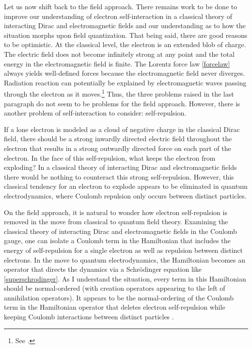 \documentclass[12pt,onecolumn,secnumarabic,amsmath,amssymb,balancelastpage,nofootinbib]{article}
\begin{document}
Let us now shift back to the field approach.  There remains work to be done to improve our understanding of electron self-interaction in a classical theory of interacting Dirac and electromagnetic fields and our understanding as to how the situation morphs upon field quantization.  That being said, there are good reasons to be optimistic.  At the classical level, the electron is an extended blob of charge.  The electric field does not become infinitely strong at any point and the total energy in the electromagnetic field is finite.  The Lorentz force law \eqref{forcelaw} always yields well-defined forces because the electromagnetic field never diverges.  Radiation reaction can potentially be explained by electromagnetic waves passing through the electron as it moves.\footnote{See \citet[sec.\ 2.2]{gravitationalfield}.}  Thus, the three problems raised in the last paragraph do not seem to be problems for the field approach.  However, there is another problem of self-interaction to consider: self-repulsion.

If a lone electron is modeled as a cloud of negative charge in the classical Dirac field, there should be a strong inwardly directed electric field throughout the electron that results in a strong outwardly directed force on each part of the electron.  In the face of this self-repulsion, what keeps the electron from exploding?  In a classical theory of interacting Dirac and electromagnetic fields there would be nothing to counteract this strong self-repulsion.  However, this classical tendency for an electron to explode appears to be eliminated in quantum electrodynamics, where Coulomb repulsion only occurs between distinct particles.

On the field approach, it is natural to wonder how electron self-repulsion is removed in the move from classical to quantum field theory.  Examining the classical theory of interacting Dirac and electromagnetic fields in the Coulomb gauge, one can isolate a Coulomb term in the Hamiltonian that includes the energy of self-repulsion for a single electron as well as repulsion between distinct electrons.  In the move to quantum electrodynamics, the Hamiltonian becomes an operator that directs the dynamics via a Schr\"{o}dinger equation like \eqref{superschrodinger}.  As I understand the situation, every term in this Hamiltonian should be normal-ordered (with creation operators appearing to the left of annihilation operators).  It appears to be the normal-ordering of the Coulomb term in the Hamiltonian operator that deletes electron self-repulsion while keeping Coulomb interactions between distinct particles \citep{selfrepulsion}.
\end{document}
